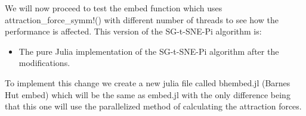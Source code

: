 We will now proceed to test the embed function which uses attraction\_force\_symm!() with different 
number of threads to see how the performance is affected. This version of the SG-t-SNE-Pi algorithm is:
\begin{itemize}
    \item The pure Julia implementation of the SG-t-SNE-Pi algorithm after the modifications.
\end{itemize}

To implement this change we create a new julia file called bhembed.jl (Barnes Hut embed) which will
be the same as embed.jl with the only difference being that this one will use the parallelized method of 
calculating the attraction forces.
